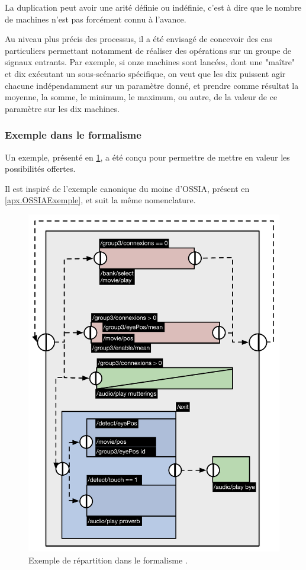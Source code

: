 La duplication peut avoir une arité définie ou indéfinie, c'est à dire que le nombre de machines n'est pas forcément connu à l'avance.

Au niveau plus précis des processus, il a été envisagé de concevoir des cas particuliers permettant notamment de réaliser des opérations sur un groupe de signaux entrants. Par exemple, si onze machines sont lancées, dont une "maître" et dix exécutant un sous-scénario spécifique, on veut que les dix puissent agir chacune indépendamment sur un paramètre donné, et prendre comme résultat la moyenne, la somme, le minimum, le maximum, ou autre, de la valeur de ce paramètre sur les dix machines.

\subsubsection{Exemple dans le formalisme}
Un exemple, présenté en \cref{fig.RepartOSSIA}, a été conçu pour permettre de mettre en valeur les possibilités offertes.

Il est inspiré de l'exemple canonique du moine d'\ac{OSSIA}, présent en \cref{apx.OSSIAExemple}, et suit la même nomenclature.

\begin{figure}[h]
	\centering
	\includegraphics[scale=0.7]{images/ossiaDistri.pdf}
	\caption{Exemple de répartition dans le formalisme .}
	\label{fig.RepartOSSIA}
\end{figure}

